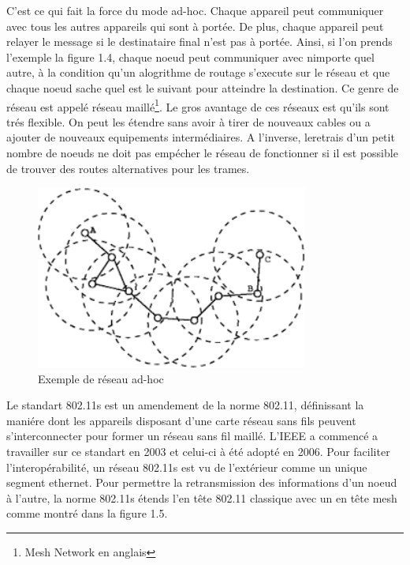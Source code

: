 C'est ce qui fait la force du mode ad-hoc. Chaque appareil peut communiquer avec tous les autres appareils qui sont à portée.
De plus, chaque appareil peut relayer le message si le destinataire final n'est pas à portée. Ainsi, si l'on prends l'exemple
la figure 1.4, chaque noeud peut communiquer avec nimporte quel autre, à la condition qu'un alogrithme de routage s'execute
sur le réseau et que chaque noeud sache quel est le suivant pour atteindre la destination. Ce genre de réseau est appelé réseau
maillé\footnote{Mesh Network en anglais}. Le gros avantage de ces réseaux est qu'ils sont trés flexible. On peut les étendre sans
avoir à tirer de nouveaux cables ou a ajouter de nouveaux equipements intermédiaires\cite{MNintro}. A l'inverse, leretrais d'un
petit nombre de noeuds ne doit pas empécher le réseau de fonctionner si il est possible de trouver des routes alternatives pour
les trames.
\begin{figure}
   \centering
   \includegraphics[width=0.8\textwidth,natwidth=488,natheight=513]{images/ad_hoc.png}
   \caption{Exemple de réseau ad-hoc}
\end{figure}

Le standart 802.11s est un amendement de la norme 802.11, définissant la maniére dont les appareils disposant d'une carte réseau
sans fils peuvent s'interconnecter pour former un réseau sans fil maillé. L'IEEE a commencé a travailler sur ce standart en 
2003 et celui-ci à été adopté en 2006. Pour faciliter l'interopérabilité, un réseau 802.11s est vu de l'extérieur comme un
unique segment ethernet. Pour permettre la retransmission des informations d'un noeud à l'autre, la norme 802.11s
étends l'en tête 802.11 classique avec un en tête mesh comme montré dans la figure 1.5\cite{MNfunc}.

